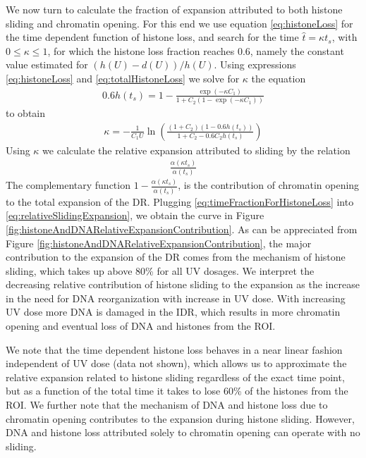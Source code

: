 \documentclass[12pt]{article}
\newcommand{\beq}{\begin{eqnarray}}
\newcommand{\eeq}{\end{eqnarray}}
\begin{document}
We now turn to calculate the fraction of expansion attributed to both histone sliding and chromatin opening. For this end we use equation \ref{eq:histoneLoss} for the time dependent function of histone loss, and search for the time $\hat{t}=\kappa t_s$, with $0\leq \kappa\leq 1$, for which the histone loss fraction reaches 0.6, namely the constant value estimated for $(h(U)-d(U))/h(U)$. Using expressions \ref{eq:histoneLoss} and \ref{eq:totalHistoneLoss} we solve for $\kappa$ the equation
\beq
0.6h(t_s)=1-\frac{\exp(-\kappa C_1)}{ 1+C_2(1-\exp(-\kappa C_1))}
\eeq
to obtain 
\beq \label{eq:timeFractionForHistoneLoss}
\kappa = -\frac{1}{C_1 U}\ln{\left( \frac{(1+C_2)(1-0.6h(t_s))}{1+C_2 -0.6C_2h(t_s)}\right)}
\eeq
Using $\kappa$ we calculate the relative expansion attributed to sliding by the relation 
\beq \label{eq:relativeSlidingExpansion}
\frac{\alpha(\kappa t_s)}{\alpha (t_s)}
\eeq
The complementary function $1-\frac{\alpha(\kappa t_s)}{\alpha(t_s)}$, is the contribution of chromatin opening to the total expansion of the DR. Plugging \ref{eq:timeFractionForHistoneLoss} into \ref{eq:relativeSlidingExpansion}, we obtain the curve in Figure \ref{fig:histoneAndDNARelativeExpansionContribution}. As can be appreciated from Figure \ref{fig:histoneAndDNARelativeExpansionContribution}, the major contribution to the expansion of the DR comes from the mechanism of histone sliding, which takes up above 80\% for all UV dosages. We interpret the decreasing relative contribution of histone sliding to the expansion as the increase in the need for DNA reorganization with increase in UV dose. With increasing UV dose more DNA is damaged in the IDR, which results in more chromatin opening and eventual loss of DNA and histones from the ROI.

We note that the time dependent histone loss behaves in a near linear fashion independent of  UV dose (data not shown), which allows us to approximate the relative expansion related to histone sliding regardless of the exact time point, but as a function of the total time it takes to lose 60\% of the histones from the ROI. We further note that the mechanism of DNA and histone loss due to chromatin opening contributes to the expansion during histone sliding. However, DNA and histone loss attributed solely to chromatin opening can operate with no sliding. 
\end{document}
